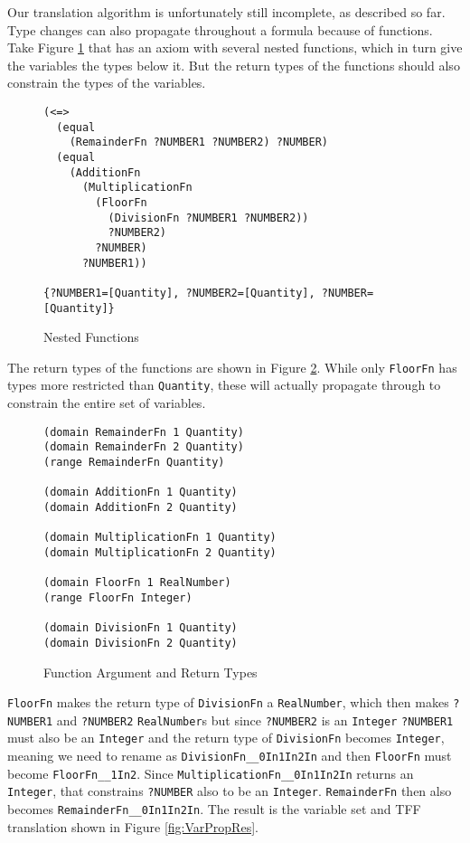 \documentclass{article}
\begin{document}
Our translation algorithm is unfortunately still incomplete, as described so far.
Type changes can also propagate throughout a formula because of functions.  Take
Figure \ref{fig:NestedFunctions} that has an axiom with several nested functions, which in turn
give the variables the types below it.  But the return types of the functions should also
constrain the types of the variables.

\begin{figure}[H]
\begin{framed}
\begin{verbatim}
(<=>
  (equal
    (RemainderFn ?NUMBER1 ?NUMBER2) ?NUMBER)
  (equal
    (AdditionFn
      (MultiplicationFn
        (FloorFn
          (DivisionFn ?NUMBER1 ?NUMBER2)) 
          ?NUMBER2) 
        ?NUMBER) 
      ?NUMBER1))

{?NUMBER1=[Quantity], ?NUMBER2=[Quantity], ?NUMBER=[Quantity]}
\end{verbatim}
\end{framed}
\caption{Nested Functions}
\label{fig:NestedFunctions}
\end{figure}

The return types of the functions are shown in Figure \ref{fig:FunctionsRetType}.  While only
\texttt{FloorFn} has types more restricted than \texttt{Quantity}, these will actually
propagate through to constrain the entire set of variables.

\begin{figure}[H]
\begin{framed}
\begin{verbatim}
(domain RemainderFn 1 Quantity)	
(domain RemainderFn 2 Quantity)
(range RemainderFn Quantity)

(domain AdditionFn 1 Quantity)
(domain AdditionFn 2 Quantity)

(domain MultiplicationFn 1 Quantity)
(domain MultiplicationFn 2 Quantity)

(domain FloorFn 1 RealNumber)	
(range FloorFn Integer)
	
(domain DivisionFn 1 Quantity)	
(domain DivisionFn 2 Quantity)
\end{verbatim}
\end{framed}
\caption{Function Argument and Return Types}
\label{fig:FunctionsRetType}
\end{figure}
 
\texttt{FloorFn} makes the return type of \texttt{DivisionFn} a
\texttt{RealNumber}, which then makes \texttt{?NUMBER1} and \texttt{?NUMBER2}
\texttt{RealNumber}s but since \texttt{?NUMBER2} is an \texttt{Integer}
\texttt{?NUMBER1} must also be an \texttt{Integer} and the return type of
\texttt{DivisionFn} becomes \texttt{Integer}, meaning we need to rename as
\texttt{DivisionFn\_\_0In1In2In} and then \texttt{FloorFn} must become
\texttt{FloorFn\_\_1In2}.  Since \texttt{MultiplicationFn\_\_0In1In2In} returns an
\texttt{Integer}, that constrains \texttt{?NUMBER} also to be an
\texttt{Integer}.  \texttt{RemainderFn} then also becomes
\texttt{RemainderFn\_\_0In1In2In}. The result is the variable set and TFF
translation shown in Figure \ref{fig:VarPropRes}.
\end{document}
